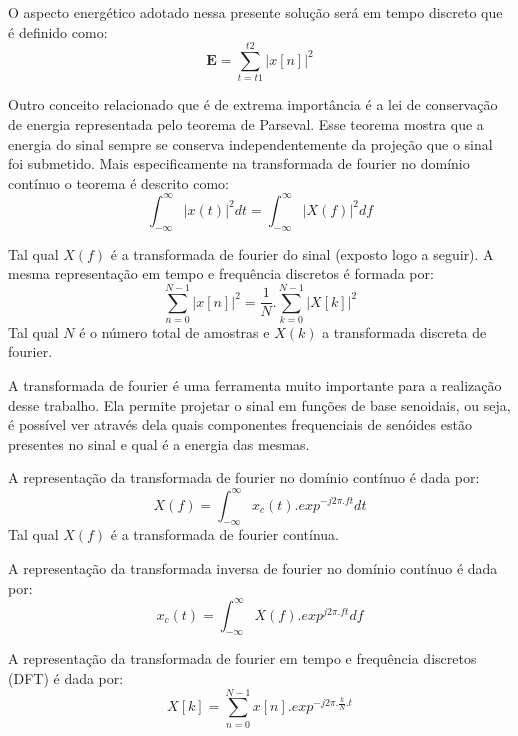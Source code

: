 O aspecto energético adotado nessa presente solução será em tempo discreto que é definido como:
\begin{equation}
\label{eqn07}
	\mathbf{E} = \sum_{t=t1}^{t2}{|x[n]|^{2}}
\end{equation}

Outro conceito relacionado que é de extrema importância é a lei de conservação de energia representada pelo teorema de Parseval. Esse teorema mostra que a energia do sinal sempre se conserva independentemente da projeção que o sinal foi submetido. Mais especificamente na transformada de fourier no domínio contínuo o teorema é descrito como:
\begin{equation}
\label{eqn08}
	\int_{-\infty}^{\infty}{|x(t)|^{2}dt} = \int_{-\infty}^{\infty}{|X(f)|^{2}df}
\end{equation}

Tal qual $X(f)$ é a transformada de fourier do sinal (exposto logo a seguir).
A mesma representação em tempo e frequência discretos é formada por:
\begin{equation}
\label{eqn09}
	\sum_{n=0}^{N - 1}{|x[n]|^{2}} =  \frac{1}{N}.\sum_{k=0}^{N - 1}{|X[k]|^{2}}
\end{equation}
Tal qual $N$ é o número total de amostras e $X(k)$ a transformada discreta de fourier.

A transformada de fourier é uma ferramenta muito importante para a realização desse trabalho. Ela permite projetar o sinal em funções de base senoidais, ou seja, é possível ver através dela quais componentes frequenciais de senóides estão presentes no sinal e qual é a energia das mesmas.

A representação da transformada de fourier no domínio contínuo é dada por:
\begin{equation}
\label{eqn10}
	X(f) = \int_{-\infty}^{\infty}{x_c(t).{exp}^{-j2\pi.ft}dt}
\end{equation}
Tal qual $X(f)$ é a transformada de fourier contínua.

A representação da transformada inversa de fourier no domínio contínuo é dada por:
\begin{equation}
\label{eqn11}
	x_c(t) = \int_{-\infty}^{\infty}{X(f).{exp}^{j2\pi.ft}df}
\end{equation}

A representação da transformada de fourier em tempo e frequência discretos (DFT) é dada por:
\begin{equation}
\label{eqn12}
	X[k] = \sum_{n=0}^{N - 1}{x[n].{exp}^{-j2\pi.\frac{k}{N}.t}}
\end{equation}

